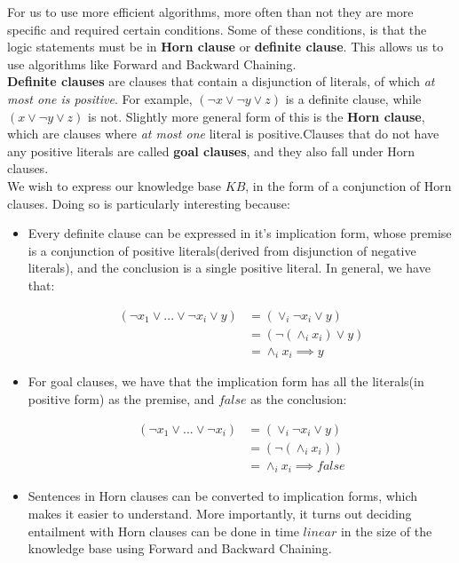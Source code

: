 \documentclass[12pt]{article}
\begin{document}
For us to use more efficient algorithms, more often than not they are more specific and required certain conditions. Some of these conditions, is that the logic statements must be in \textbf{Horn clause} or \textbf{definite clause}. This allows us to use algorithms like Forward and Backward Chaining.\\

\textbf{Definite clauses} are clauses that contain a disjunction of literals, of which \textit{at most one is positive}. For example, $(\lnot x \lor \lnot y \lor z)$ is a definite clause, while $(x \lor \lnot y \lor z)$ is not. Slightly more general form of this is the \textbf{Horn clause}, which are clauses where \textit{at most one} literal is positive.Clauses that do not have any positive literals are called \textbf{goal clauses}, and they also fall under Horn clauses.\\

We wish to express our knowledge base $KB$, in the form of a conjunction of Horn clauses. Doing so is particularly interesting because:

\begin{itemize}
\item Every definite clause can be expressed in it's implication form, whose premise is a conjunction of positive literals(derived from disjunction of negative literals), and the conclusion is a single positive literal. In general, we have that:

\begin{equation*}
\begin{aligned}
(\lnot x_1 \lor ... \lor \lnot x_i \lor y) &= (\lor_i \lnot x_i \lor y)\\
&= (\lnot (\land_i x_i) \lor y) \\
&= \land_i x_i \implies y
\end{aligned}
\end{equation*}

\item For goal clauses, we have that the implication form has all the literals(in positive form) as the premise, and $false$ as the conclusion:

\begin{equation*}
\begin{aligned}
(\lnot x_1 \lor ... \lor \lnot x_i) &= (\lor_i \lnot x_i \lor y)\\
&= (\lnot (\land_i x_i)) \\
&= \land_i x_i \implies false
\end{aligned}
\end{equation*}

\item Sentences in Horn clauses can be converted to implication forms, which makes it easier to understand. More importantly, it turns out deciding entailment with Horn clauses can be done in time $linear$ in the size of the knowledge base using Forward and Backward Chaining.

\end{itemize}
\end{document}
